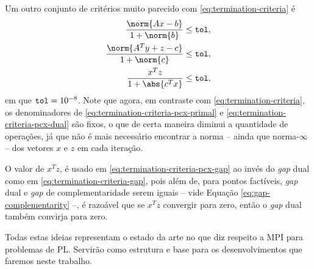 Um outro conjunto de critérios muito parecido  com
\eqref{eq:termination-criteria}  é
\begin{subequations}
\label{eq:termination-criteria-pcx}
\begin{align}
	\dfrac{\norm{Ax - b}}{1 + \norm{b}} \leq \tol,
	\label{eq:termination-criteria-pcx-primal}\\
	\dfrac{\norm{A^Ty + z - c}}{1 + \norm{c}} \leq \tol,
	\label{eq:termination-criteria-pcx-dual}\\
	\dfrac{x^{T}z}{1 + \abs{c^Tx}}\leq
	\tol,\label{eq:termination-criteria-pcx-gap}
\end{align}
\end{subequations}
em que $\mathtt{tol} = 10^{-8}$. Note que agora, em contraste com
\eqref{eq:termination-criteria}, os denominadores de 
\eqref{eq:termination-criteria-pcx-primal} e
\eqref{eq:termination-criteria-pcx-dual} são fixos, o que de certa maneira
diminui a quantidade de operações, já que não é mais necessário encontrar a
norma  -- ainda que norma-$\infty$ --  dos vetores $x$ e $z$ em cada
iteração. 

O valor de $x^{T}z$,  é usado em \eqref{eq:termination-criteria-pcx-gap} ao
 invés do \emph{gap} dual  como em \eqref{eq:termination-criteria-gap}, pois além de, para pontos factíveis, \emph{gap} dual e \emph{gap} de complementaridade serem iguais -- vide Equação \eqref{eq:gap-complementarity} --, é razoável que se $x^{T}z$ convergir para zero, então o \emph{gap} dual também convirja para zero.




Todas estas ideias representam o estado da arte no que diz respeito a \ac{MPI}
para problemas de \ac{PL}. Servirão como estrutura e base para os
desenvolvimentos que faremos neste trabalho.
